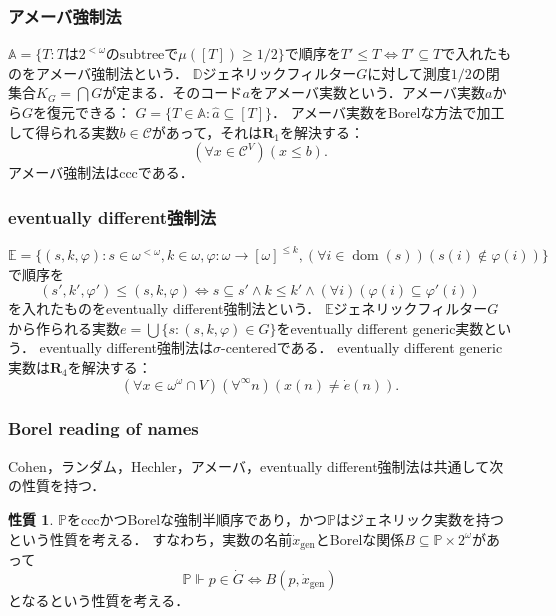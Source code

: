 \documentclass[uplatex,dvipdfmx]{jsarticle}
\renewcommand{\P}{\mathbb{P}}
\newcommand{\dom}{\operatorname{dom}}
\newcommand\forces{\Vdash}
\newcommand{\relR}{\mathbf{R}}
\renewcommand\subset{\subseteq}
\theoremstyle{definition}
\newtheorem{property}[thm]{性質}
\begin{document}
		\subsubsection{アメーバ強制法}
		
		$\mathbb{A} = \{ T : T\text{は}2^{<\omega}\text{のsubtreeで}\mu([T])\ge 1/2 \}$で順序を$T' \le T \iff T' \subset T$で入れたものをアメーバ強制法という．
		$\mathbb{D}$ジェネリックフィルター$G$に対して測度$1/2$の閉集合$K_G = \bigcap G$が定まる．そのコード$a$をアメーバ実数という．アメーバ実数$a$から$G$を復元できる： $G = \{ T \in \mathbb{A} : \hat{a} \subset [T] \}$．
		アメーバ実数をBorelな方法で加工して得られる実数$b \in \mathcal{C}$があって，それは$\relR_1$を解決する：
		\[
		(\forall x \in \mathcal{C}^V) (x \le b).
		\]
		アメーバ強制法はcccである．
		
		\subsubsection{eventually different強制法}
		
		$\mathbb{E} = \{ (s,k,\varphi) : s \in \omega^{<\omega}, k \in \omega, \varphi \colon \omega \to [\omega]^{\le k}, (\forall i \in \dom(s))(s(i) \not \in \varphi(i)) \}$で順序を
		\[
		(s', k', \varphi') \le (s, k, \varphi) \iff s \subset s' \land k \le k' \land (\forall i)(\varphi(i) \subset \varphi'(i))
		\]
		を入れたものをeventually different強制法という．	
		$\mathbb{E}$ジェネリックフィルター$G$から作られる実数$e = \bigcup \{ s  : (s, k, \varphi) \in G \}$をeventually different generic実数という．
		eventually different強制法は$\sigma$-centeredである．
		eventually different generic実数は$\relR_4$を解決する：
		\[
		(\forall x \in \omega^\omega \cap V)(\forall^\infty n)(x(n) \ne \dot{e}(n)).
		\]
		
		\subsubsection{Borel reading of names}
		
		Cohen，ランダム，Hechler，アメーバ，eventually different強制法は共通して次の性質を持つ．
		
		\begin{property}\label{property:hasgenericreal}
			$\P$をcccかつBorelな強制半順序であり，かつ$\P$はジェネリック実数を持つという性質を考える．
			すなわち，実数の名前$\dot{x}_\mathrm{gen}$とBorelな関係$B \subset \P \times 2^\omega$があって
			\[
			\P \forces p \in \dot{G} \iff B(p, \dot{x}_\mathrm{gen})
			\]
			となるという性質を考える．
		\end{property}
	
\end{document}
